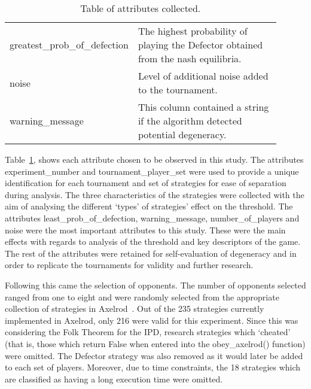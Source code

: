 \begin{table}
\begin{tabular}{>{\raggedright}p{0.3\linewidth}>{\raggedright\arraybackslash}p{0.6\linewidth}}
    greatest\_prob\_of\_defection  & The highest probability of playing the
    Defector obtained from the nash equilibria. \\
    
    noise                       & Level of additional noise added to the
    tournament. \\
                      
    warning\_message             & This column contained a string if the
    algorithm detected potential degeneracy. \\
    \bottomrule
\end{tabular}
\caption{Table of attributes collected.}\label{tab:attr_tab} 
\end{table}

Table~\ref{tab:attr_tab}, shows each attribute chosen to be observed in this
study. The attributes experiment\_number and tournament\_player\_set were used
to provide a unique identification for each tournament and set of strategies for
ease of separation during analysis. The three characteristics of the strategies
were collected with the aim of analysing the different `types' of strategies'
effect on the threshold. The attributes least\_prob\_of\_defection,
warning\_message, number\_of\_players and noise were the most important
attributes to this study. These were the main effects with regards to analysis
of the threshold and key descriptors of the game. The rest of the attributes
were retained for self-evaluation of degeneracy and in order to replicate the
tournaments for validity and further research.

Following this came the selection of opponents. The number of opponents selected
ranged from one to eight and were randomly selected from the appropriate
collection of strategies in Axelrod~\cite{axelrodproject}. Out of
the 235 strategies currently implemented in Axelrod, only 216 were valid for
this experiment. Since this was considering the Folk Theorem for the IPD,
research strategies which `cheated' (that is, those which return False when
entered into the obey\_axelrod() function) were omitted. The Defector strategy
was also removed as it would later be added to each set of players. Moreover,
due to time constraints, the 18 strategies which are classified as having a long
execution time were omitted. 

